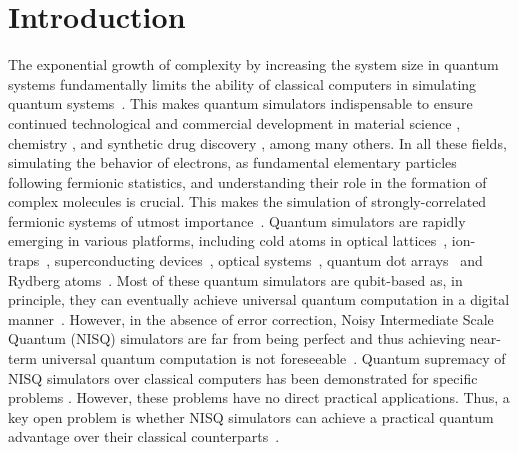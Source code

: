 \documentclass[aps, prx, reprint, superscriptaddress]{revtex4-2}
\begin{document}
\maketitle


\section{Introduction}

The exponential growth of complexity by increasing the system size in quantum systems fundamentally limits the ability of classical computers in simulating quantum systems~\citep{feynman1982simulating,lloyd1996universal}. 
This makes quantum simulators indispensable to ensure continued technological and commercial development in material science \cite{ma2020quantum,PhysRevX.8.011044,PhysRevLett.120.110501}, chemistry \cite{hempel_quantum_2018,cao2019quantum,arguello2019analogue,bauer2020quantum}, and synthetic drug discovery \cite{Cavasotto2020}, among many others.
In all these fields, simulating the behavior of electrons, as fundamental elementary particles following fermionic statistics, and understanding their role in the formation of complex molecules is crucial. 
This makes the simulation of strongly-correlated fermionic systems of utmost importance~\cite{georgescu2014quantum,stanisic2022observing}. 
Quantum simulators are rapidly emerging in various platforms, including cold atoms in optical lattices~\cite{bloch2012quantum,gross_quantum_2017,yang2020observation, zhou2022thermalization}, ion-traps~\cite{ barreiro2011open,lanyon2011universal,blatt2012quantum,monroe2021programmable,kokail2019self}, superconducting devices~\cite{houck2012chip,arute2019quantum,google2020hartree,gong2021quantum,wu2021strong,mildenberger2022probing}, optical systems~\cite{aspuru2012photonic,wang2019boson,wang2020integrated,bao2023very,zhong2020quantum}, quantum dot arrays~\cite{byrnes2008quantum,hensgens2017quantum,mortemousque2021coherent} and Rydberg atoms~\cite{weimer2010rydberg,labuhn2016tunable,schauss2018quantum,Nguyen2018towards,keesling2019quantum,Omran2019Generation,browaeys2020many,scholl2021quantum,cohen2021quantum,young2022tweezer,yan2022two-dimensional,wu2021concise,cheng2023variational}. 
Most of these quantum simulators are qubit-based as, in principle, they can eventually achieve universal quantum computation in a digital manner~\cite{lloyd1996universal}. 
However, in the absence of error correction, Noisy Intermediate Scale Quantum (NISQ) simulators are far from being perfect and thus achieving near-term universal quantum computation is not foreseeable~\cite{Preskill2018quantumcomputingin, bharti2022noisy}. 
Quantum supremacy of NISQ simulators over classical computers has been demonstrated for specific problems \cite{arute2019quantum,zhong2020quantum,wu2021strong,gong2021quantum}. 
However, these problems have no direct practical applications.
Thus, a key open problem is whether NISQ simulators can achieve a practical quantum advantage over their classical counterparts~\cite{daley2022practical}. 
\end{document}
